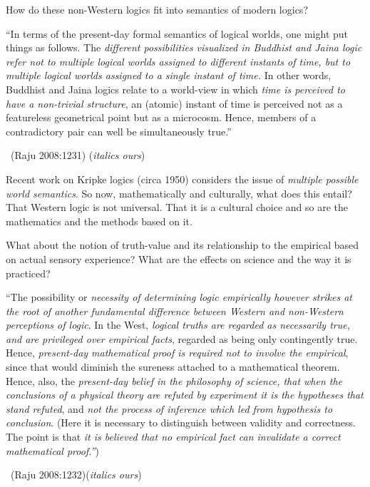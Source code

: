 How do these non-Western logics fit into semantics of modern logics?

\begin{myquote}
“In terms of the present-day formal semantics of logical worlds, one might put things as follows. The \textit{different possibilities visualized in Buddhist and Jaina logic refer not to multiple logical worlds assigned to different instants of time, but to multiple logical worlds assigned to a single instant of time.} In other words, Buddhist and Jaina logics relate to a world-view in which \textit{time is perceived to have a non-trivial structure}, an (atomic) instant of time is perceived not as a featureless geometrical point but as a microcosm. Hence, members of a contradictory pair can well be simultaneously true.” 

~\hfill (Raju 2008:1231) (\textit{italics ours})
\end{myquote}

Recent work on Kripke logics (circa 1950) considers the issue of \textit{multiple possible world semantics}. So now, mathematically and culturally, what does this entail? That Western logic is not universal. That it is a cultural choice and so are the mathematics and the methods based on it.

What about the notion of truth-value and its relationship to the empirical based on actual sensory experience? What are the effects on science and the way it is practiced?

\begin{myquote}
“The possibility or \textit{necessity of determining logic empirically however strikes at the root of another fundamental difference between Western and non-Western perceptions of logic}. In the West, \textit{logical truths are regarded as necessarily true, and are privileged over empirical facts}, regarded as being only contingently true. Hence, \textit{present-day mathematical proof is required not to involve the empirical}, since that would diminish the sureness attached to a mathematical theorem. Hence, also, the \textit{present-day belief in the philosophy of science, that when the conclusions of a physical theory are refuted by experiment it is the hypotheses that stand refuted}, and \textit{not the process of inference which led from hypothesis to conclusion}. (Here it is necessary to distinguish between validity and correctness. The point is that \textit{it is believed that no empirical fact can invalidate a correct mathematical proof.”}) 

~\hfill (Raju 2008:1232)(\textit{italics ours})
\end{myquote}

